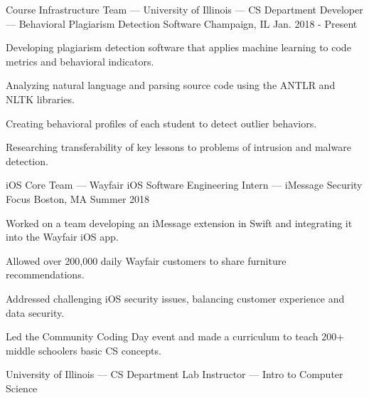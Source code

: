 
\begin{cventries}
\cventry
{Course Infrastructure Team — University of Illinois — CS Department} %
{Developer — Behavioral Plagiarism Detection Software} %
{Champaign, IL} %
{Jan. 2018 - Present} %
{
	\begin{cvitems} %
		\item {Developing plagiarism detection software that applies machine learning to code metrics and behavioral indicators.}
		\item {Analyzing natural language and parsing source code using the ANTLR and NLTK libraries.}
		\item {Creating behavioral profiles of each student to detect outlier behaviors.}
		\item {Researching transferability of key lessons to problems of intrusion and malware detection.}
	\end{cvitems}
}
\cventry
{iOS Core Team — Wayfair} %
{iOS Software Engineering Intern — iMessage Security Focus} %
{Boston, MA} %
{Summer 2018} %
{
	\begin{cvitems} %
		\item {Worked on a team developing an iMessage extension in Swift and integrating it into the Wayfair iOS app.}
		\item {Allowed over 200,000 daily Wayfair customers to share furniture recommendations.}
		\item {Addressed challenging iOS security issues, balancing customer experience and data security.}
		\item {Led the Community Coding Day event and made a curriculum to teach 200+ middle schoolers basic CS concepts.}
	\end{cvitems}
}
\cventry
{University of Illinois — CS Department} %
{Lab Instructor — Intro to Computer Science} %

\end{cventries}
